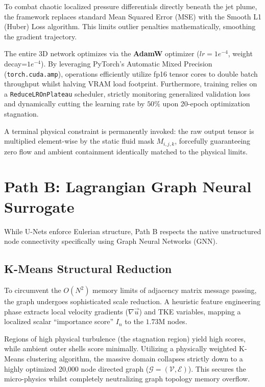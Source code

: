 \documentclass[conference]{IEEEtran}
\begin{document}
To combat chaotic localized pressure differentials directly beneath the jet plume, the framework replaces standard Mean Squared Error (MSE) with the Smooth L1 (Huber) Loss algorithm. This limits outlier penalties mathematically, smoothing the gradient trajectory.

The entire 3D network optimizes via the \textbf{AdamW} optimizer ($lr=1e^{-4}$, weight decay=$1e^{-4}$). By leveraging PyTorch's Automatic Mixed Precision (\texttt{torch.cuda.amp}), operations efficiently utilize fp16 tensor cores to double batch throughput whilst halving VRAM load footprint. Furthermore, training relies on a \texttt{ReduceLROnPlateau} scheduler, strictly monitoring generalized validation loss and dynamically cutting the learning rate by $50\%$ upon 20-epoch optimization stagnation.

A terminal physical constraint is permanently invoked: the raw output tensor is multiplied element-wise by the static fluid mask $M_{i,j,k}$, forcefully guaranteeing zero flow and ambient containment identically matched to the physical limits.

\section{Path B: Lagrangian Graph Neural Surrogate}
While U-Nets enforce Eulerian structure, Path B respects the native unstructured node connectivity specifically using Graph Neural Networks (GNN).

\subsection{K-Means Structural Reduction}
To circumvent the $O(N^2)$ memory limits of adjacency matrix message passing, the graph undergoes sophisticated scale reduction. A heuristic feature engineering phase extracts local velocity gradients ($\nabla \vec{u}$) and TKE variables, mapping a localized scalar ``importance score'' $I_n$ to the $1.73$M nodes.

Regions of high physical turbulence (the stagnation region) yield high scores, while ambient outer shells score minimally. Utilizing a physically weighted K-Means clustering algorithm, the massive domain collapses strictly down to a highly optimized 20,000 node directed graph ($\mathcal{G} = (\mathcal{V}, \mathcal{E})$). This secures the micro-physics whilst completely neutralizing graph topology memory overflow.
\end{document}
